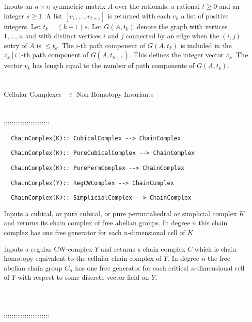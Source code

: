 \documentclass[a4paper,11pt]{report}
\begin{document}
{ 

 Inputs an $n\times n$ symmetric matrix $A$ over the rationals, a rational $t \ge 0$ and an integer $s \ge 1$. A list $[v_1, \ldots, v_{t+1}]$ is returned with each $v_k$ a list of positive integers. Let $t_k = (k-1)s$. Let $G(A,t_k)$ denote the graph with vertices $1, \ldots, n$ and with distinct vertices $i$ and $j$ connected by an edge when the $(i,j)$ entry of $A$ is $\le t_k$. The $i$-th path component of $G(A,t_k)$ is included in the $v_k[i]$-th path component of $G(A,t_{k+1})$. This defines the integer vector $v_k$. The vector $v_k$ has length equal to the number of path components of $G(A,t_k)$. \\
 \\
 \\
 Cellular Complexes $\longrightarrow$ Non Homotopy Invariants \\
 \\
 \\
 ::::::::::::::::::::::::\\
 
\begin{verbatim}  ChainComplex(K):: CubicalComplex --> ChainComplex
\end{verbatim}
 
\begin{verbatim}  ChainComplex(K):: PureCubicalComplex --> ChainComplex
\end{verbatim}
 
\begin{verbatim}  ChainComplex(K):: PurePermComplex --> ChainComplex
\end{verbatim}
 
\begin{verbatim}  ChainComplex(Y):: RegCWComplex --> ChainComplex
\end{verbatim}
 
\begin{verbatim}  ChainComplex(K):: SimplicialComplex --> ChainComplex
\end{verbatim}


 

 Inputs a cubical, or pure cubical, or pure permutahedral or simplicial complex $K$ and returns its chain complex of free abelian groups. In degree $n$ this chain complex has one free generator for each $n$-dimensional cell of $K$. 

 Inputs a regular CW-complex $Y$ and returns a chain complex $C$ which is chain homotopy equivalent to the cellular chain complex of $Y$. In degree $n$ the free abelian chain group $C_n$ has one free generator for each critical $n$-dimensional cell of $Y$ with respect to some discrete vector field on $Y$. \\
 \\
 \\
 \\
 ::::::::::::::::::::::::\\
 
}
\end{document}
